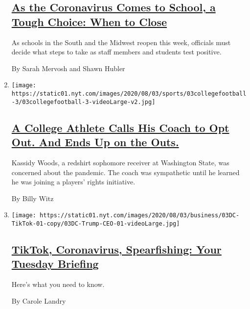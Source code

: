 \begin{enumerate}
{  \subsection{\texorpdfstring{\href{/2020/08/03/us/school-closing-coronavirus.html}{As
  the Coronavirus Comes to School, a Tough Choice: When to
  Close}}{As the Coronavirus Comes to School, a Tough Choice: When to Close}}\label{as-the-coronavirus-comes-to-school-a-tough-choice-when-to-close}}

  As schools in the South and the Midwest reopen this week, officials
  must decide what steps to take as staff members and students test
  positive.

  By Sarah Mervosh and Shawn Hubler
\item
  \texttt{[image: https://static01.nyt.com/images/2020/08/03/sports/03collegefootball-3/03collegefootball-3-videoLarge-v2.jpg]}

  \hypertarget{a-college-athlete-calls-his-coach-to-opt-out-and-ends-up-on-the-outs}{%
  \subsection{\texorpdfstring{\href{/2020/08/03/sports/coronavirus-college-athletes-opt-out.html}{A
  College Athlete Calls His Coach to Opt Out. And Ends Up on the
  Outs.}}{A College Athlete Calls His Coach to Opt Out. And Ends Up on the Outs.}}\label{a-college-athlete-calls-his-coach-to-opt-out-and-ends-up-on-the-outs}}

  Kassidy Woods, a redshirt sophomore receiver at Washington State, was
  concerned about the pandemic. The coach was sympathetic until he
  learned he was joining a players' rights initiative.

  By Billy Witz
\item
  \texttt{[image: https://static01.nyt.com/images/2020/08/03/business/03DC-TikTok-01-copy/03DC-Trump-CEO-01-videoLarge.jpg]}

  \hypertarget{tiktok-coronavirus-spearfishing-your-tuesday-briefing}{%
  \subsection{\texorpdfstring{\href{/2020/08/03/briefing/coronavirus-tiktok-afghanistan-australia.html}{TikTok,
  Coronavirus, Spearfishing: Your Tuesday
  Briefing}}{TikTok, Coronavirus, Spearfishing: Your Tuesday Briefing}}\label{tiktok-coronavirus-spearfishing-your-tuesday-briefing}}

  Here's what you need to know.

  By Carole Landry
\end{enumerate}

